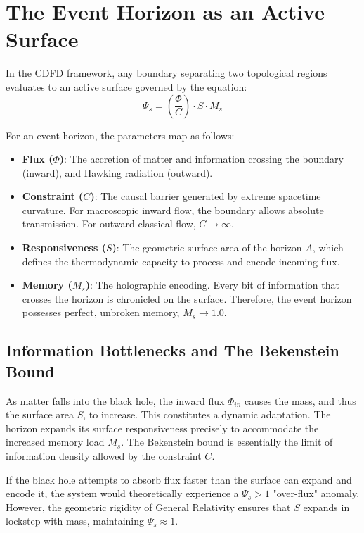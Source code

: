 \documentclass[11pt,a4paper]{article}
\begin{document}
\section{The Event Horizon as an Active Surface}
In the CDFD framework, any boundary separating two topological regions evaluates to an active surface governed by the equation:
\begin{equation}
    \Psi_s = \left( \frac{\Phi}{C} \right) \cdot S \cdot M_s
\end{equation}

For an event horizon, the parameters map as follows:
\begin{itemize}
    \item \textbf{Flux ($\Phi$)}: The accretion of matter and information crossing the boundary (inward), and Hawking radiation (outward).
    \item \textbf{Constraint ($C$)}: The causal barrier generated by extreme spacetime curvature. For macroscopic inward flow, the boundary allows absolute transmission. For outward classical flow, $C \to \infty$.
    \item \textbf{Responsiveness ($S$)}: The geometric surface area of the horizon $A$, which defines the thermodynamic capacity to process and encode incoming flux.
    \item \textbf{Memory ($M_s$)}: The holographic encoding. Every bit of information that crosses the horizon is chronicled on the surface. Therefore, the event horizon possesses perfect, unbroken memory, $M_s \to 1.0$.
\end{itemize}

\subsection{Information Bottlenecks and The Bekenstein Bound}
As matter falls into the black hole, the inward flux $\Phi_{in}$ causes the mass, and thus the surface area $S$, to increase. This constitutes a dynamic adaptation. The horizon expands its surface responsiveness precisely to accommodate the increased memory load $M_s$. The Bekenstein bound is essentially the limit of information density allowed by the constraint $C$.

If the black hole attempts to absorb flux faster than the surface can expand and encode it, the system would theoretically experience a $\Psi_s > 1$ "over-flux" anomaly. However, the geometric rigidity of General Relativity ensures that $S$ expands in lockstep with mass, maintaining $\Psi_s \approx 1$.
\end{document}
